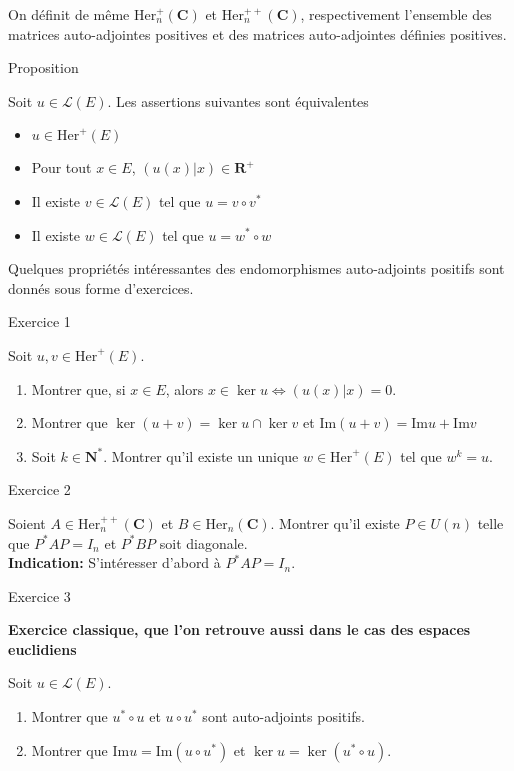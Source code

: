 \documentclass[a4paper,11pt]{article}
\newcommand{\N}{\mathbf{N}}
\newcommand{\R}{\mathbf{R}}
\newcommand{\C}{\mathbf{C}}
\renewcommand{\L}{\mathcal{L}}
\newenvironment{gbar}[1]{%
		\def\FrameCommand{{\color{#1}\vrule width 3pt }
		\colorbox{gris2}} %
		\MakeFramed{\advance\hsize -\width\FrameRestore}} %
		{\endMakeFramed}
\newenvironment{cadre}[2]{
		\begin{bclogo}[couleur = gris , barre = none , noborder = true , logo=\vspace{1em}]{
			\hspace{.14em}
			\colorbox{#1}{
				\parbox{15em}{
				\sffamily\normalsize{\color{gris}#2}
			}}
			\vspace{.2em}
		}
			\begin{gbar}{#1}
	}
	{
			\end{gbar}
		\end{bclogo}
	}
\begin{document}
On définit de même $\mathrm{Her}_n^+(\C)$ et $\mathrm{Her}_n^{++}(\C)$, respectivement l'ensemble des matrices auto-adjointes positives et des matrices auto-adjointes définies positives.

\begin{cadre}{rouge}{Proposition}
Soit $u\in\L(E)$. Les assertions suivantes sont équivalentes
\begin{itemize}[label={\color{rouge}•}]
\item $u\in\mathrm{Her}^+(E)$
\item Pour tout $x\in E$, $(u(x)\vert x)\in\R^+$
\item Il existe $v\in \L(E)$ tel que $u=v\circ v^*$
\item Il existe $w\in \L(E)$ tel que $u=w^*\circ w$
\end{itemize}
\end{cadre}

Quelques propriétés intéressantes des endomorphismes auto-adjoints positifs sont donnés sous forme d'exercices.

\begin{cadre}{jaune}{Exercice 1}
Soit $u,v\in\mathrm{Her}^+(E)$.
\begin{enumerate}[label=\sffamily\textbf{\color{jaune}\theenumi .}]
\item Montrer que, si $x\in E$, alors $x\in\ker u\Leftrightarrow (u(x)\vert x)=0$.
\item Montrer que $\ker (u+v)=\ker u\cap\ker v$ et $\mathrm{Im}(u+v)=\mathrm{Im}u+\mathrm{Im}v$
\item Soit $k\in\N^*$. Montrer qu'il existe un unique $w\in\mathrm{Her}^+(E)$ tel que $w^k=u$.
\end{enumerate}
\end{cadre}

\begin{cadre}{jaune}{Exercice 2}
Soient $A\in\mathrm{Her}_n^{++}(\C)$ et $B\in\mathrm{Her}_n(\C)$. Montrer qu'il existe $P\in U(n)$ telle que $P^*AP=I_n$ et $P^*BP$ soit diagonale.\\

{\sffamily\color{jaune}\textbf{Indication:}} S'intéresser d'abord à $P^*AP=I_n$.
\end{cadre}

\begin{cadre}{jaune}{Exercice 3}
{\sffamily\textbf{\color{jaune} Exercice classique, que l'on retrouve aussi dans le cas des espaces euclidiens}}

Soit $u\in\L(E)$.
\begin{enumerate}[label=\sffamily\textbf{\color{jaune}\theenumi .}]
\item Montrer que $u^*\circ u$ et $u\circ u^*$ sont auto-adjoints positifs.
\item Montrer que $\mathrm{Im}u=\mathrm{Im}(u\circ u^*)$ et $\ker u=\ker (u^*\circ u)$.
\end{enumerate}
\end{cadre}
\end{document}
